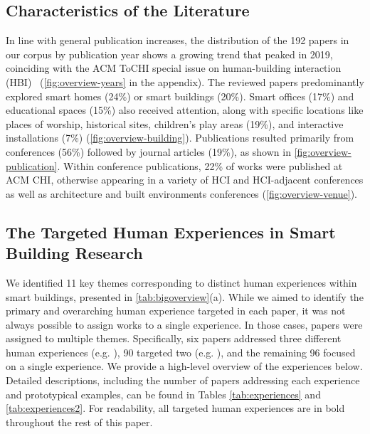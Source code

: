 \subsection{Characteristics of the Literature}
\label{sec-ch2:findings-descriptive}
In line with general publication increases, the distribution of the 192 papers in our corpus by publication year shows a growing trend that peaked in 2019, coinciding with the ACM ToCHI special issue on human-building interaction (HBI)~\cite{alavi2019introduction} (\autoref{fig:overview-years} in the appendix). The reviewed papers predominantly explored smart homes (24\%) or smart buildings (20\%). Smart offices (17\%) and educational spaces (15\%) also received attention, along with specific locations like places of worship, historical sites, children's play areas (19\%), and interactive installations (7\%)  (\autoref{fig:overview-building}). Publications resulted primarily from conferences (56\%) followed by journal articles (19\%), as shown in \autoref{fig:overview-publication}. Within conference publications, 22\% of works were published at ACM CHI, otherwise appearing in a variety of HCI and HCI-adjacent conferences as well as architecture and built environments conferences (\autoref{fig:overview-venue}).   


\subsection{The Targeted Human Experiences in Smart Building Research}
\label{sec-ch2:findings-experiences}
We identified 11 key themes corresponding to distinct human experiences within smart buildings, presented in \autoref{tab:bigoverview}(a). While we aimed to identify the primary and overarching human experience targeted in each paper, it was not always possible to assign works to a single experience. In those cases, papers were assigned to multiple themes. Specifically, six papers addressed three different human experiences (e.g. \cite{telhan2010interaction}), 90 targeted two (e.g. \cite{zum2022interactive}), and the remaining 96 focused on a single experience. We provide a high-level overview of the experiences below. Detailed descriptions, including the number of papers addressing each experience and prototypical examples, can be found in Tables \ref{tab:experiences} and \ref{tab:experiences2}. For readability, all targeted human experiences are in bold throughout the rest of this paper.


\begingroup
\fontsize{7.3}{8.7}\selectfont
\setlength{\tabcolsep}{2.4pt}
\renewcommand{\arraystretch}{1.04}
\setlength{\LTleft}{0pt}
\setlength{\LTright}{0pt}

